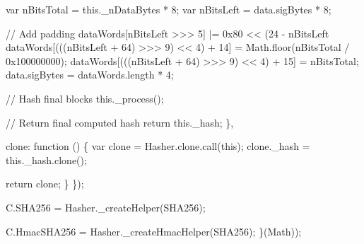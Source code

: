 \begin{DoxyCodeInclude}
            var nBitsTotal = this.\_nDataBytes * 8;
            var nBitsLeft = data.sigBytes * 8;

            \textcolor{comment}{// Add padding}
            dataWords[nBitsLeft >>> 5] |= 0x80 << (24 - nBitsLeft %
            dataWords[(((nBitsLeft + 64) >>> 9) << 4) + 14] = Math.floor(nBitsTotal / 0x100000000);
            dataWords[(((nBitsLeft + 64) >>> 9) << 4) + 15] = nBitsTotal;
            data.sigBytes = dataWords.length * 4;

            \textcolor{comment}{// Hash final blocks}
            this.\_process();

            \textcolor{comment}{// Return final computed hash}
            \textcolor{keywordflow}{return} this.\_hash;
        \},

        clone: \textcolor{keyword}{function} () \{
            var clone = Hasher.clone.call(\textcolor{keyword}{this});
            clone.\_hash = this.\_hash.clone();

            \textcolor{keywordflow}{return} clone;
        \}
    \});

    C.SHA256 = Hasher.\_createHelper(SHA256);

    C.HmacSHA256 = Hasher.\_createHmacHelper(SHA256);
\}(Math));
\end{DoxyCodeInclude}
 